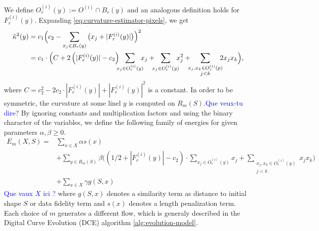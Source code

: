\documentclass[runningheads]{llncs}
\newcommand{\todo}[1]{{\textcolor{blue}{#1}}}
\begin{document}
We define $O_{r}^{(i)}(y) := O^{(i)} \cap B_r(y)$ and an analogous definition holds for $F_{r}^{(i)}(y)$. Expanding \eqref{eq:curvature-estimator-pixels}, we get 
\begin{align*}
  \hat{\kappa}^2(y) &= c_1\Big( c_2 - \sum_{x_j \in B_r(y)} \big( {x_j} + |F_{r}^{(i)}(y)| \big) \Big)^2 \\
   &= c_1 \cdot \Big( C + 2\left( |F_{r}^{(i)}(y)| - c_2 \right) \hspace{-2mm}\sum_{x_j \in O_{r}^{(i)}(y)}\hspace{-2mm}{x_j} + \hspace{-2mm}\sum_{x_j \in O_{r}^{(i)}(y)}\hspace{-2mm}{x_j^2} + \hspace{-2mm}\sum_{ \substack{x_j,x_k \in O_{r}^{(i)}(p) \\ j<k} }\hspace{-2mm}{2x_jx_k}  \Big),
\end{align*}
where $C=c_2^2 - 2c_2 \cdot |F_{r}^{(i)}(y)| + |F_{r}^{(i)}(y)|^2$ is a constant. In
order to be symmetric, the curvature at some linel $y$ is computed on
$R_m(S)$.\todo{Que veux-tu dire?} By ignoring constants and multiplication factors and using
the binary character of the variables, we define the following family
of energies for given parameters $\alpha,\beta \geq 0$.
\begin{align}
  E_m(X,S) =& \sum_{x \in X}{\alpha s(x)} \nonumber \\ 
  & + \sum_{y \in R_m(S)}{ \beta \Big( { (1/2+ |F_{r}^{(i)}(y)|-c_2) \cdot \sum_{x_j \in O_{r}^{(i)}(y)}{x_j} } + \sum_{ \substack{x_j,x_k \in O_{r}^{(i)}(y) \\ j<k} }{x_jx_k} \Big) } \nonumber \\
  & + \sum_{x \in X}{\gamma g(S,x)}
  \label{eq:energy-family}
\end{align}
\todo{Que vaux $X$ ici ?}	
where $g(S,x)$ denotes a similarity term as distance to initial shape $S$ or data fidelity term and $s(x)$ denotes a length penalization term. Each choice of $m$ generates a different flow, which is generaly described in the Digital Curve Evolution (DCE) algorithm \ref{alg:evolution-model}.
\end{document}
